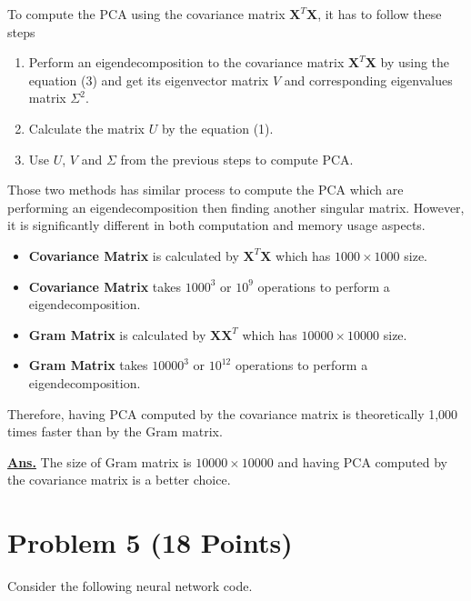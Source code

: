 \documentclass[12pt, a4paper]{article}
\begin{document}
        \vspace{1em}

        \noindent To compute the PCA using the covariance matrix $\mathbf{X}^T \mathbf{X}$, it has to follow these steps
        \begin{enumerate}
            \item Perform an eigendecomposition to the covariance matrix $\mathbf{X}^T \mathbf{X}$ by using the equation (3)
            and get its eigenvector matrix $V$ and corresponding eigenvalues matrix $\Sigma^2$.
            \item Calculate the matrix $U$ by the equation (1).
            \item Use $U$, $V$ and $\Sigma$ from the previous steps to compute PCA.
        \end{enumerate}

        \vspace{1em}

        Those two methods has similar process to compute the PCA which are performing an eigendecomposition then finding another singular matrix.
        However, it is significantly different in both computation and memory usage aspects.
        \begin{itemize}
            \item \textbf{Covariance Matrix} is calculated by $\mathbf{X}^T \mathbf{X}$ which has $1000 \times 1000$ size.
            \item \textbf{Covariance Matrix} takes ${1000}^3$ or ${10}^9$ operations to perform a eigendecomposition.
            \item \textbf{Gram Matrix} is calculated by $\mathbf{X} \mathbf{X}^T$ which has $10000 \times 10000$ size.
            \item \textbf{Gram Matrix} takes ${10000}^3$ or ${10}^{12}$ operations to perform a eigendecomposition.
        \end{itemize}
        \noindent Therefore, having PCA computed by the covariance matrix is theoretically 1,000 times faster than by the Gram matrix.

        \vspace{1em}

        \noindent \underline{\textbf{Ans.}} The size of Gram matrix is $10000 \times 10000$
        and having PCA computed by the covariance matrix is a better choice.

    \pagebreak

    \section{Problem 5 (18 Points)}
        Consider the following neural network code.
\end{document}
